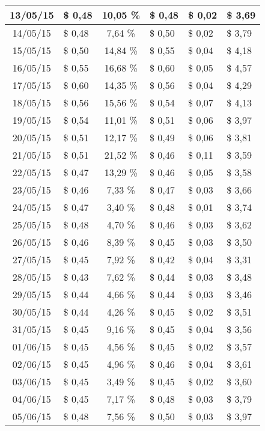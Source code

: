 \begin{center}
\begin{small}
\begin{longtable}{|c|l|c|l|l|l|}
13/05/15 & \$ 0,48 & 10,05 \% & \$ 0,48 & \$ 0,02 & \$ 3,69 \\ \hline
14/05/15 & \$ 0,48 & 7,64 \% & \$ 0,50 & \$ 0,02 & \$ 3,79 \\ \hline
15/05/15 & \$ 0,50 & 14,84 \% & \$ 0,55 & \$ 0,04 & \$ 4,18 \\ \hline
16/05/15 & \$ 0,55 & 16,68 \% & \$ 0,60 & \$ 0,05 & \$ 4,57 \\ \hline
17/05/15 & \$ 0,60 & 14,35 \% & \$ 0,56 & \$ 0,04 & \$ 4,29 \\ \hline
18/05/15 & \$ 0,56 & 15,56 \% & \$ 0,54 & \$ 0,07 & \$ 4,13 \\ \hline
19/05/15 & \$ 0,54 & 11,01 \% & \$ 0,51 & \$ 0,06 & \$ 3,97 \\ \hline
20/05/15 & \$ 0,51 & 12,17 \% & \$ 0,49 & \$ 0,06 & \$ 3,81 \\ \hline
21/05/15 & \$ 0,51 & 21,52 \% & \$ 0,46 & \$ 0,11 & \$ 3,59 \\ \hline
22/05/15 & \$ 0,47 & 13,29 \% & \$ 0,46 & \$ 0,05 & \$ 3,58 \\ \hline
23/05/15 & \$ 0,46 & 7,33 \% & \$ 0,47 & \$ 0,03 & \$ 3,66 \\ \hline
24/05/15 & \$ 0,47 & 3,40 \% & \$ 0,48 & \$ 0,01 & \$ 3,74 \\ \hline
25/05/15 & \$ 0,48 & 4,70 \% & \$ 0,46 & \$ 0,03 & \$ 3,62 \\ \hline
26/05/15 & \$ 0,46 & 8,39 \% & \$ 0,45 & \$ 0,03 & \$ 3,50 \\ \hline
27/05/15 & \$ 0,45 & 7,92 \% & \$ 0,42 & \$ 0,04 & \$ 3,31 \\ \hline
28/05/15 & \$ 0,43 & 7,62 \% & \$ 0,44 & \$ 0,03 & \$ 3,48 \\ \hline
29/05/15 & \$ 0,44 & 4,66 \% & \$ 0,44 & \$ 0,03 & \$ 3,46 \\ \hline
30/05/15 & \$ 0,44 & 4,26 \% & \$ 0,45 & \$ 0,02 & \$ 3,51 \\ \hline
31/05/15 & \$ 0,45 & 9,16 \% & \$ 0,45 & \$ 0,04 & \$ 3,56 \\ \hline
01/06/15 & \$ 0,45 & 4,56 \% & \$ 0,45 & \$ 0,02 & \$ 3,57 \\ \hline
02/06/15 & \$ 0,45 & 4,96 \% & \$ 0,46 & \$ 0,04 & \$ 3,61 \\ \hline
03/06/15 & \$ 0,45 & 3,49 \% & \$ 0,45 & \$ 0,02 & \$ 3,60 \\ \hline
04/06/15 & \$ 0,45 & 7,17 \% & \$ 0,48 & \$ 0,03 & \$ 3,79 \\ \hline
05/06/15 & \$ 0,48 & 7,56 \% & \$ 0,50 & \$ 0,03 & \$ 3,97 \\ \hline

\end{longtable}
\end{small}
\end{center}
